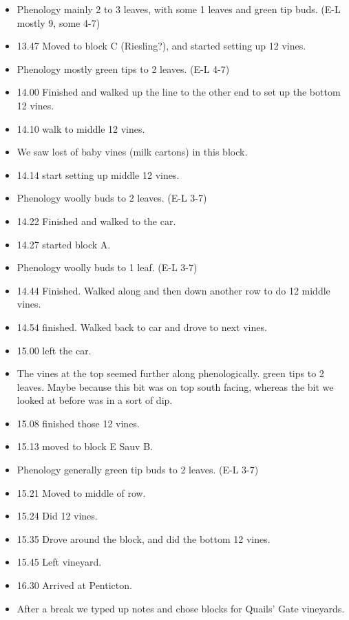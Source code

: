 \documentclass[11pt,letter]{article}
\newenvironment{smitemize}{
\begin{itemize}
  \setlength{\itemsep}{0pt}
  \setlength{\parskip}{0.8pt}
  \setlength{\parsep}{0pt}}
{\end{itemize}
}
\begin{document}
\begin{smitemize}
\item Phenology mainly 2 to 3 leaves, with some 1 leaves and green tip buds. (E-L mostly 9, some 4-7)  
\item 13.47 Moved to block C (Riesling?), and started setting up 12 vines.
\item Phenology mostly green tips to 2 leaves. (E-L 4-7)
\item 14.00 Finished and walked up the line to the other end to set up the bottom 12 vines. 
\item 14.10 walk to middle 12 vines. 
\item We saw lost of baby vines (milk cartons) in this block. 
\item 14.14 start setting up middle 12 vines.
\item Phenology woolly buds to 2 leaves. (E-L 3-7)
\item 14.22 Finished and walked to the car.
\item 14.27 started block A.
\item Phenology woolly buds to 1 leaf. (E-L 3-7)
\item 14.44 Finished. Walked along and then down another row to do 12 middle vines. 
\item 14.54 finished. Walked back to car and drove to next vines.
\item 15.00 left the car.
\item The vines at the top seemed further along phenologically. green tips to 2 leaves. Maybe because this bit was on top south facing, whereas the bit we looked at before was in a sort of dip.
\item 15.08 finished those 12 vines. 
\item 15.13 moved to block E Sauv B.
\item Phenology generally green tip buds to 2 leaves. (E-L 3-7)
\item 15.21 Moved to middle of row.
\item 15.24 Did 12 vines.
\item 15.35 Drove around the block, and did the bottom 12 vines.
\item 15.45 Left vineyard.
\item 16.30 Arrived at Penticton.
\item After a break we typed up notes and chose blocks for Quails' Gate vineyards.
\end{smitemize}
\end{document}
